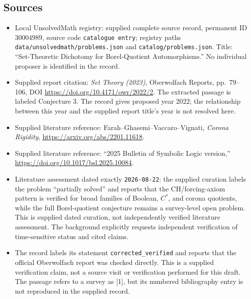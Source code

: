 \documentclass[11pt]{article}
\begin{document}
\subsection{Sources}
\begin{itemize}
\item Local UnsolvedMath registry: supplied complete source record, permanent ID \(30004989\), source code \texttt{catalogue entry}; registry paths \texttt{data/unsolvedmath/problems.json} and \texttt{catalog/problems.json}. Title: ``Set-Theoretic Dichotomy for Borel-Quotient Automorphisms.'' No individual proposer is identified in the record.
\item Supplied report citation: \emph{Set Theory (2023)}, Oberwolfach Reports, pp.\ 79--106, DOI \url{https://doi.org/10.4171/owr/2022/2}. The extracted passage is labeled Conjecture 3. The record gives proposed year 2022; the relationship between this year and the supplied report title's year is not resolved here.
\item Supplied literature reference: Farah--Ghasemi--Vaccaro--Vignati, \emph{Corona Rigidity}, \url{https://arxiv.org/abs/2201.11618}.
\item Supplied literature reference: ``2025 Bulletin of Symbolic Logic version,'' \url{https://doi.org/10.1017/bsl.2025.10084}.
\item Literature assessment dated exactly \texttt{2026-08-22}: the supplied curation labels the problem ``partially solved'' and reports that the CH/forcing-axiom pattern is verified for broad families of Boolean, \(C^*\), and corona quotients, while the full Borel-quotient conjecture remains a survey-level open problem. This is supplied dated curation, not independently verified literature assessment. The background explicitly requests independent verification of time-sensitive status and cited claims.
\item The record labels its statement \texttt{corrected\_verified} and reports that the official Oberwolfach report was checked directly. This is a supplied verification claim, not a source visit or verification performed for this draft. The passage refers to a survey as [1], but its numbered bibliography entry is not reproduced in the supplied record.
\end{itemize}
\end{document}
